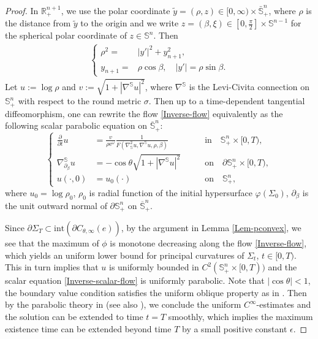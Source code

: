 \documentclass[11pt,reqno]{amsart}
\theoremstyle{definition}
\theoremstyle{remark}
\numberwithin{equation}{section}
\renewcommand{\(}{\left(}
\renewcommand{\)}{\right)}
\renewcommand{\-}{\overline}
\renewcommand{\b}{\beta}
\renewcommand{\t}{\theta}
\newcommand{\s}{\sigma}
\begin{document}
\begin{proof}
	In $\mathbb R_{+}^{n+1}$, we use the polar coordinate $\tilde{y}=(\rho,z)\in [0,\infty)\times \bar{\mathbb{S}}_+^n$, where $\rho$ is the distance from $\tilde{y}$ to the origin and we write $z=(\b,\xi)\in [0,\frac{\pi}{2}]\times \mathbb S^{n-1}$ for the spherical polar coordinate of $z\in \mathbb S^{n}$. Then
	\begin{align}\label{dn-rho}
		\left\{\begin{aligned}
			\rho^2=&|y'|^2+y_{n+1}^2,\\
			y_{n+1}=&\rho \cos \b,\quad |y'|=\rho \sin \b.
		\end{aligned}   \right.
	\end{align}
	Let $u:=\log \rho$ and $v:=\sqrt{1+|\nabla^{\mathbb S}u|^2}$, where $\nabla^{\mathbb S}$ is the Levi-Civita connection on $\mathbb S^{n}_+$ with respect to the round metric $\s$. Then up to a time-dependent tangential diffeomorphism, one can rewrite the flow \eqref{Inverse-flow} equivalently as the following scalar parabolic equation on $\-{\mathbb S}_{+}^{n}$:
	\begin{equation}\label{Inverse-scalar-flow}
		\left\{\begin{aligned}
			\frac{\partial}{\partial t} u&=\frac{v}{\rho\mathrm{e}^{\omega}}\frac{1}{F(\nabla^2_{\mathbb S} u, \nabla^\mathbb S u, \rho, \b)} \qquad &\text{in}\quad \mathbb S_{+}^n \times[0,T),\\
			\nabla^{\mathbb S}_{\partial_\b}u&= -\cos\t \sqrt{1+|\nabla^{\mathbb S}u|^2}\qquad &\text{on}\quad \partial\mathbb S_+^{n} \times[0,T),\\
			u(\cdot,0)&=u_0(\cdot) \qquad &\text{on} \quad \mathbb S_{+}^n,
		\end{aligned}\right.
	\end{equation}
	where $u_0=\log\rho_{0}$, $\rho_0$ is radial function of the initial hypersurface $\varphi(\Sigma_0)$, $\partial_\b$ is the unit outward normal of $\partial \mathbb S_+^n$ on $\-{\mathbb S}_+^{n}$. 
	
	Since $\partial\Sigma_{T}\subset\mathrm{int}(\widehat{\partial C_{\theta,\infty}}(e))$, by the argument in Lemma \ref{Lem-pconvex}, we see that the maximum of $\phi$ is monotone decreasing along the flow \eqref{Inverse-flow}, which yields an uniform lower bound for principal curvatures of $\Sigma_t$, $t\in[0,T)$. This in turn implies that $u$ is uniformly bounded in $C^2(\mathbb{S}^n_{+}\times[0,T))$ and the scalar equation \eqref{Inverse-scalar-flow} is uniformly parabolic. Note that $|\cos\theta|<1$, the boundary value condition satisfies the uniform oblique property as in \cite{Ural1991}. Then by the parabolic theory in \cite[Theorem 5]{Ural1991} (see also \cite[\S 14]{Lieb96}), we conclude the uniform $C^\infty$-estimates and the solution can be extended to time $t=T$ smoothly, which implies the maximum existence time can be extended beyond time $T$ by a small positive constant $\epsilon$.
\end{proof}
\end{document}
